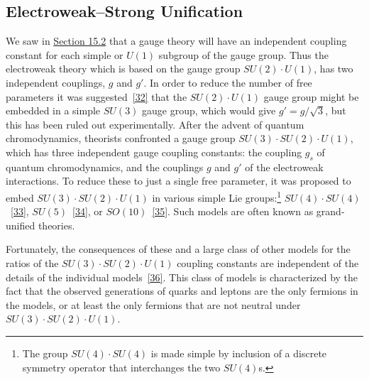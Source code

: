 
\subsection{Electroweak--Strong Unification}
\label{sec:21.5}

We saw in \hyperref[sec:15.2]{Section 15.2} that a gauge theory will have an independent coupling constant for each simple or $U(1)$ subgroup of the gauge group. Thus the electroweak theory which is based on the gauge group $SU(2)\cdot U(1)$, has two independent couplings, $g$ and $g'$. In order to reduce the number of free parameters it was suggested~\hyperref[ch21-ref-32]{[32]} that the $SU(2)\cdot U(1)$ gauge group might be embedded in a simple $SU(3)$ gauge group, which would give $g'=g/\sqrt{3}$, but this has been ruled out experimentally. After the advent of quantum chromodynamics, theorists confronted a gauge group $SU(3)\cdot SU(2)\cdot U(1)$, which has three independent gauge coupling constants: the coupling $g_s$ of quantum chromodynamics, and the couplings $g$ and $g'$ of the electroweak interactions. To reduce these to just a single free parameter, it was proposed to embed $SU(3)\cdot SU(2)\cdot U(1)$ in various simple Lie groups:\footnote{The group $SU(4)\cdot SU(4)$ is made simple by inclusion of a discrete symmetry operator that interchanges the two $SU(4)$s.} $SU(4)\cdot SU(4)$~\hyperref[ch21-ref-33]{[33]}, $SU(5)$~\hyperref[ch21-ref-34]{[34]}, or $SO(10)$~\hyperref[ch21-ref-35]{[35]}. Such models are often known as grand-unified theories.

Fortunately, the consequences of these and a large class of other models for the ratios of the $SU(3)\cdot SU(2)\cdot U(1)$ coupling constants are independent of the details of the individual models~\hyperref[ch21-ref-36]{[36]}. This class of models is characterized by the fact that the observed generations of quarks and leptons are the only fermions in the models, or at least the only fermions that are not neutral under $SU(3)\cdot SU(2)\cdot U(1)$.

